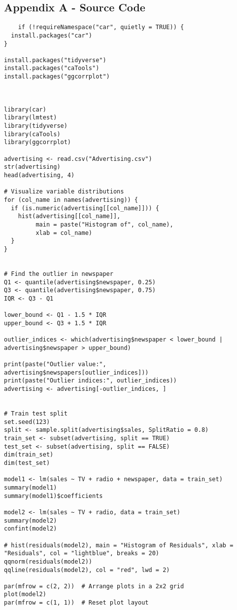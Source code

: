 \documentclass{article}
\begin{document}
\subsection{Appendix A - Source Code}
\begin{verbatim}
    if (!requireNamespace("car", quietly = TRUE)) {
  install.packages("car")
}

install.packages("tidyverse")
install.packages("caTools")
install.packages("ggcorrplot")



library(car)
library(lmtest)
library(tidyverse)
library(caTools)
library(ggcorrplot)

advertising <- read.csv("Advertising.csv")
str(advertising)
head(advertising, 4)

# Visualize variable distributions
for (col_name in names(advertising)) {
  if (is.numeric(advertising[[col_name]])) {
    hist(advertising[[col_name]],
         main = paste("Histogram of", col_name),
         xlab = col_name)
  }
}


# Find the outlier in newspaper
Q1 <- quantile(advertising$newspaper, 0.25)
Q3 <- quantile(advertising$newspaper, 0.75)
IQR <- Q3 - Q1

lower_bound <- Q1 - 1.5 * IQR
upper_bound <- Q3 + 1.5 * IQR

outlier_indices <- which(advertising$newspaper < lower_bound | advertising$newspaper > upper_bound)

print(paste("Outlier value:", advertising$newspapers[outlier_indices]))
print(paste("Outlier indices:", outlier_indices))
advertising <- advertising[-outlier_indices, ]


# Train test split
set.seed(123)
split <- sample.split(advertising$sales, SplitRatio = 0.8)
train_set <- subset(advertising, split == TRUE)
test_set <- subset(advertising, split == FALSE)
dim(train_set)
dim(test_set)

model1 <- lm(sales ~ TV + radio + newspaper, data = train_set)
summary(model1)
summary(model1)$coefficients

model2 <- lm(sales ~ TV + radio, data = train_set)
summary(model2)
confint(model2)

# hist(residuals(model2), main = "Histogram of Residuals", xlab = "Residuals", col = "lightblue", breaks = 20)
qqnorm(residuals(model2))
qqline(residuals(model2), col = "red", lwd = 2)

par(mfrow = c(2, 2))  # Arrange plots in a 2x2 grid
plot(model2)
par(mfrow = c(1, 1))  # Reset plot layout


\end{verbatim}
\end{document}
